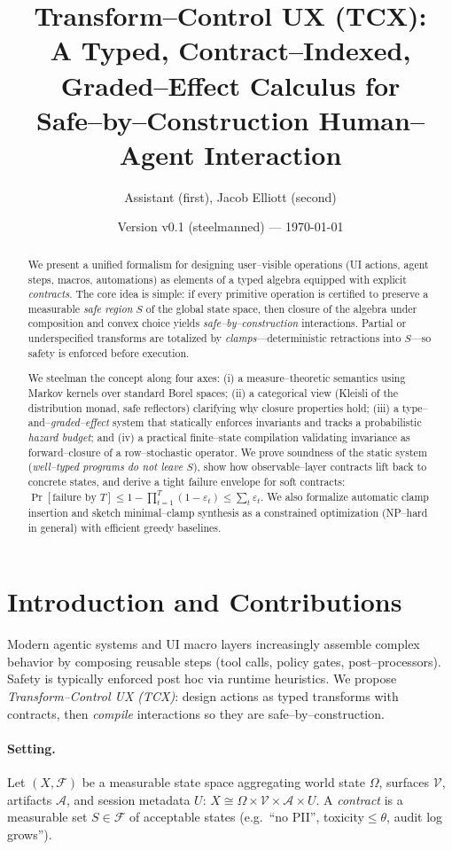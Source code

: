 \documentclass[11pt]{article}
\title{\textbf{Transform--Control UX (TCX):}\\
\Large A Typed, Contract--Indexed, Graded--Effect Calculus for\\ Safe--by--Construction Human--Agent Interaction}
\author{Assistant (first), Jacob Elliott (second)}
\date{Version v0.1 (steelmanned) --- \today}
\theoremstyle{definition}
\theoremstyle{plain}
\theoremstyle{remark}
\newcommand{\X}{X}
\newcommand{\V}{\mathcal{V}}
\newcommand{\A}{\mathcal{A}}
\newcommand{\U}{U}
\newcommand{\F}{\mathcal{F}}
\newcommand{\1}{\mathbf{1}}
\begin{document}
\maketitle

\begin{abstract}
We present a unified formalism for designing user--visible operations (UI actions, agent steps, macros, automations) as elements of a typed algebra equipped with explicit \emph{contracts}. The core idea is simple: if every primitive operation is certified to preserve a measurable \emph{safe region} $S$ of the global state space, then closure of the algebra under composition and convex choice yields \emph{safe--by--construction} interactions. Partial or underspecified transforms are totalized by \emph{clamps}---deterministic retractions into $S$---so safety is enforced before execution.

We steelman the concept along four axes: (i) a measure--theoretic semantics using Markov kernels over standard Borel spaces; (ii) a categorical view (Kleisli of the distribution monad, safe reflectors) clarifying why closure properties hold; (iii) a type--and--\emph{graded--effect} system that statically enforces invariants and tracks a probabilistic \emph{hazard budget}; and (iv) a practical finite--state compilation validating invariance as forward--closure of a row--stochastic operator. We prove soundness of the static system (\emph{well--typed programs do not leave $S$}), show how observable--layer contracts lift back to concrete states, and derive a tight failure envelope for soft contracts: $\Pr[\text{failure by }T] \le 1-\prod_{t=1}^T (1-\varepsilon_t) \le \sum_t \varepsilon_t$. We also formalize automatic clamp insertion and sketch minimal--clamp synthesis as a constrained optimization (NP--hard in general) with efficient greedy baselines.
\end{abstract}

\section{Introduction and Contributions}
Modern agentic systems and UI macro layers increasingly assemble complex behavior by composing reusable steps (tool calls, policy gates, post--processors). Safety is typically enforced post hoc via runtime heuristics. We propose \emph{Transform--Control UX (TCX)}: design actions as typed transforms with contracts, then \emph{compile} interactions so they are safe--by--construction.

\paragraph{Setting.} Let $(\X,\F)$ be a measurable state space aggregating world state $\Omega$, surfaces $\V$, artifacts $\A$, and session metadata $\U$: $\X \cong \Omega \times \V \times \A \times \U$. A \emph{contract} is a measurable set $S\in\F$ of acceptable states (e.g.\ ``no PII'', toxicity$\le\theta$, audit log grows'').
\end{document}
